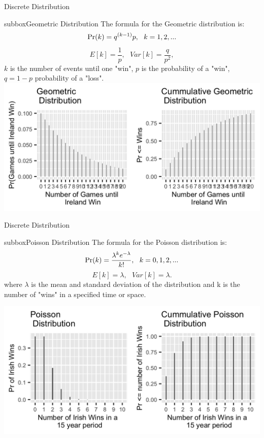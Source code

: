\documentclass[10pt,a4paper]{article}
\def\Pr{\mathop{\rm Pr}}
\begin{document}
\begin{multicols}{3}
\begin{textbox}{Discrete Distribution}
\begin{subbox}{subbox}{Geometric Distribution}
\tiny
The formula for the Geometric distribution is:
\[\Pr(k)=q^{(k-1)}p, \ \ k=1,2,... \]
	\[E[k]=\frac{1}{p}, \ \ \ Var[k]=\frac{q}{p^2},\]
 $k$ is the number of events until one "win", $p$ is the probability of a "win", $q=1-p$ probability of a "loss". 
    \includegraphics[width=\textwidth]{Figures/Distributions/Geometric.png}
\end{subbox}
\end{textbox}
\begin{textbox}{Discrete Distribution}

\begin{subbox}{subbox}{Poisson Distribution}
	\tiny
	The formula for the Poisson distribution is:
	\[\Pr(k)=\frac{\lambda^ke^{-\lambda}}{k!}, \ \ k=0,1,2,... \]
	\[E[k]=\lambda, \ \ \ Var[k]=\lambda. \]
where $\lambda$ is the mean and standard deviation of the distribution and k is the number of "wins" in a specified time or space. 

    \includegraphics[width=\textwidth]{Figures/Distributions/Poisson.png}
\end{subbox}


\end{textbox}
\end{multicols}
\end{document}
